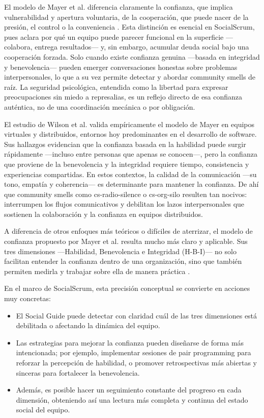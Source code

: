 El modelo de Mayer et al. diferencia claramente la confianza, que implica vulnerabilidad y apertura voluntaria, de la cooperación, que puede nacer de la presión, el control o la conveniencia \cite{mayer_integrative_1995}.
Esta distinción es esencial en SocialScrum, pues aclara por qué un equipo puede parecer funcional en la superficie —colabora, entrega resultados— y, sin embargo, acumular deuda social bajo una cooperación forzada.
Solo cuando existe confianza genuina —basada en integridad y benevolencia— pueden emerger conversaciones honestas sobre problemas interpersonales, lo que a su vez permite detectar y abordar community smells de raíz.
La seguridad psicológica, entendida como la libertad para expresar preocupaciones sin miedo a represalias, es un reflejo directo de esa confianza auténtica, no de una coordinación mecánica o por obligación.

El estudio de Wilson et al. \cite{wilson_all_2006} valida empíricamente el modelo de Mayer en equipos virtuales y distribuidos, entornos hoy predominantes en el desarrollo de software.
Sus hallazgos evidencian que la confianza basada en la habilidad puede surgir rápidamente —incluso entre personas que apenas se conocen—, pero la confianza que proviene de la benevolencia y la integridad requiere tiempo, consistencia y experiencias compartidas.
En estos contextos, la calidad de la comunicación —su tono, empatía y coherencia— es determinante para mantener la confianza.
De ahí que community smells como \gls{cs-radio-silence} o \gls{cs-org-silo} resulten tan nocivos: interrumpen los flujos comunicativos y debilitan los lazos interpersonales que sostienen la colaboración y la confianza en equipos distribuidos.

A diferencia de otros enfoques más teóricos o difíciles de aterrizar, el modelo de confianza propuesto por Mayer et al. resulta mucho más claro y aplicable. Sus tres dimensiones —Habilidad, Benevolencia e Integridad (H-B-I)— no solo facilitan entender la confianza dentro de una organización, sino que también permiten medirla y trabajar sobre ella de manera práctica \cite{mayer_integrative_1995}.

En el marco de SocialScrum, esta precisión conceptual se convierte en acciones muy concretas:

\begin{itemize}
    \item El Social Guide puede detectar con claridad cuál de las tres dimensiones está debilitada o afectando la dinámica del equipo.
    \item Las estrategias para mejorar la confianza pueden diseñarse de forma más intencionada; por ejemplo, implementar sesiones de pair programming para reforzar la percepción de habilidad, o promover retrospectivas más abiertas y sinceras para fortalecer la benevolencia.
    \item Además, es posible hacer un seguimiento constante del progreso en cada dimensión, obteniendo así una lectura más completa y continua del estado social del equipo.
\end{itemize}

